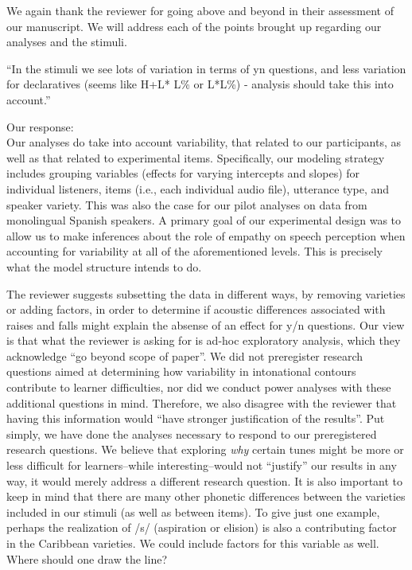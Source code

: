 \documentclass[]{article}
\begin{document}
We again thank the reviewer for going above and beyond in their assessment of our manuscript.
We will address each of the points brought up regarding our analyses and the stimuli.

``In the stimuli we see lots of variation in terms of yn questions, and less variation for declaratives (seems like H+L* L\% or L*L\%) - analysis should take this into account.''

Our response:\\
Our analyses do take into account variability, that related to our participants, as well as that related to experimental items.
Specifically, our modeling strategy includes grouping variables (effects for varying intercepts and slopes) for individual listeners, items (i.e., each individual audio file), utterance type, and speaker variety.
This was also the case for our pilot analyses on data from monolingual Spanish speakers.
A primary goal of our experimental design was to allow us to make inferences about the role of empathy on speech perception when accounting for variability at all of the aforementioned levels.
This is precisely what the model structure intends to do.

The reviewer suggests subsetting the data in different ways, by removing varieties or adding factors, in order to determine if acoustic differences associated with raises and falls might explain the absense of an effect for y/n questions.
Our view is that what the reviewer is asking for is ad-hoc exploratory analysis, which they acknowledge ``go beyond scope of paper''.
We did not preregister research questions aimed at determining how variability in intonational contours contribute to learner difficulties, nor did we conduct power analyses with these additional questions in mind.
Therefore, we also disagree with the reviewer that having this information would ``have stronger justification of the results''.
Put simply, we have done the analyses necessary to respond to our preregistered research questions.
We believe that exploring \emph{why} certain tunes might be more or less difficult for learners--while interesting--would not ``justify'' our results in any way, it would merely address a different research question.
It is also important to keep in mind that there are many other phonetic differences between the varieties included in our stimuli (as well as between items).
To give just one example, perhaps the realization of /s/ (aspiration or elision) is also a contributing factor in the Caribbean varieties.
We could include factors for this variable as well.
Where should one draw the line?
\end{document}

